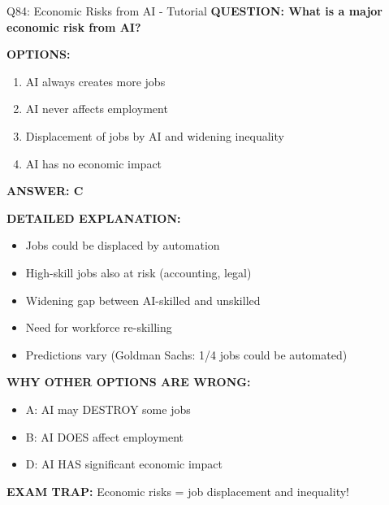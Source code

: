 \documentclass[8pt]{beamer}
\begin{document}
	\begin{frame}{Q84: Economic Risks from AI - Tutorial}
		\fontsize{6.5}{7.5}\selectfont
		\textbf{QUESTION: What is a major economic risk from AI?}
		
		\vspace{0.1cm}
		\textbf{OPTIONS:}
		\begin{enumerate}
			\item AI always creates more jobs
			\item AI never affects employment
			\item Displacement of jobs by AI and widening inequality
			\item AI has no economic impact
		\end{enumerate}
		
		\vspace{0.1cm}
		\textcolor{myblue}{\textbf{ANSWER: C}}
		
		\vspace{0.1cm}
		\textbf{DETAILED EXPLANATION:}
		\begin{itemize}
			\item Jobs could be displaced by automation
			\item High-skill jobs also at risk (accounting, legal)
			\item Widening gap between AI-skilled and unskilled
			\item Need for workforce re-skilling
			\item Predictions vary (Goldman Sachs: 1/4 jobs could be automated)
		\end{itemize}
		
		\vspace{0.1cm}
		\textcolor{myred}{\textbf{WHY OTHER OPTIONS ARE WRONG:}}
		\begin{itemize}
			\item \textcolor{myred}{A:} AI may DESTROY some jobs
			\item \textcolor{myred}{B:} AI DOES affect employment
			\item \textcolor{myred}{D:} AI HAS significant economic impact
		\end{itemize}
		
		\textcolor{myred}{\textbf{EXAM TRAP:}} Economic risks = \textcolor{myblue}{job displacement and inequality}!
	\end{frame}
	
\end{document}
